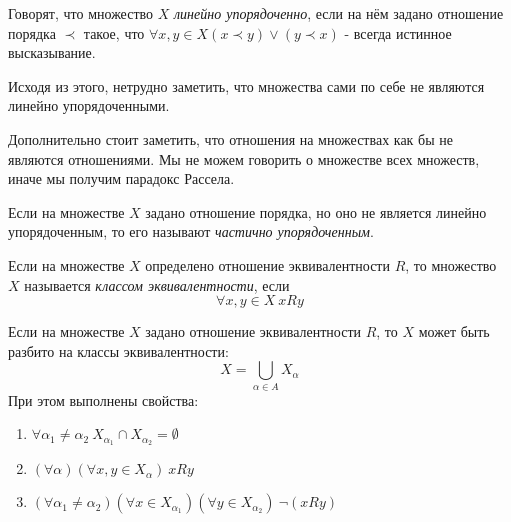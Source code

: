 \begin{definition}
    Говорят, что множество $X$ \textit{линейно упорядоченно}, если на нём задано отношение порядка $\prec$ такое, что $\forall x, y \in X (x \prec y) \vee (y \prec x)$ - всегда истинное высказывание.
\end{definition}

Исходя из этого, нетрудно заметить, что множества сами по себе не являются линейно упорядоченными.

\begin{anote}
    Дополнительно стоит заметить, что отношения на множествах как бы не являются отношениями. Мы не можем говорить о множестве всех множеств, иначе мы получим парадокс Рассела.
\end{anote}

\begin{definition}
    Если на множестве $X$ задано отношение порядка, но оно не является линейно упорядоченным, то его называют \textit{частично упорядоченным}.
\end{definition}

\begin{definition}
    Если на множестве $X$ определено отношение эквивалентности $R$, то множество $X$ называется \textit{классом эквивалентности}, если
    \[
    	\forall x, y \in X\ xRy
    \]
\end{definition}

\begin{theorem}
    Если на множестве $X$ задано отношение эквивалентности $R$, то $X$ может быть разбито на классы эквивалентности:
    $$
        X = \bigcup\limits_{\alpha \in A} X_{\alpha}
    $$
    При этом выполнены свойства:
    \begin{enumerate}
        \item $\forall \alpha_1 \neq \alpha_2\ X_{\alpha_1} \cap X_{\alpha_2} = \emptyset$
        \item $(\forall \alpha)(\forall x, y \in X_{\alpha})\ xRy$
        \item $(\forall \alpha_1 \neq \alpha_2)(\forall x \in X_{\alpha_1})(\forall y \in X_{\alpha_2})\ \neg (xRy)$
    \end{enumerate}
\end{theorem}